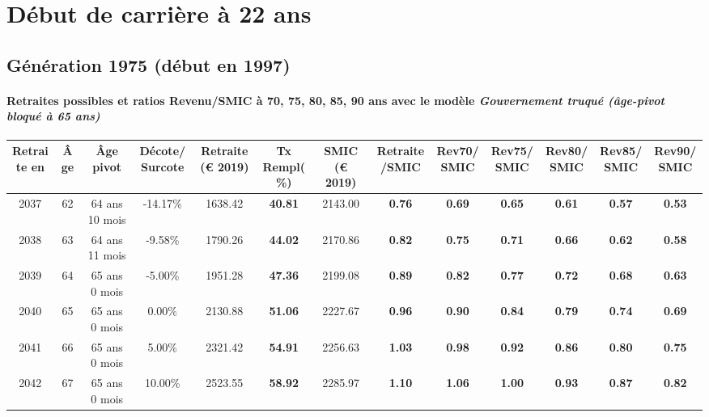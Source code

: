  \addto{\captionsenglish}{ \renewcommand{\mtctitle}{}} \setcounter{minitocdepth}{2} 
 \minitoc \newpage 

\section{Début de carrière à 22 ans} 

\subsection{Génération 1975 (début en 1997)} 

\paragraph{Retraites possibles et ratios Revenu/SMIC à 70, 75, 80, 85, 90 ans avec le modèle \emph{Gouvernement truqué (âge-pivot bloqué à 65 ans)}}  
 
{ \scriptsize \begin{center} 
\begin{tabular}[htb]{|c|c||c|c||c|c||c||c|c|c|c|c|c|} 
\hline 
 Retraite en &  Âge &  Âge pivot &  Décote/Surcote &  Retraite (\euro{} 2019) &  Tx Rempl(\%) &  SMIC (\euro{} 2019) &  Retraite/SMIC &  Rev70/SMIC &  Rev75/SMIC &  Rev80/SMIC &  Rev85/SMIC &  Rev90/SMIC \\ 
\hline \hline 
 2037 &  62 &  64 ans 10 mois &  -14.17\% &  1638.42 &  {\bf 40.81} &  2143.00 &  {\bf {\color{red} 0.76}} &  {\bf {\color{red} 0.69}} &  {\bf {\color{red} 0.65}} &  {\bf {\color{red} 0.61}} &  {\bf {\color{red} 0.57}} &  {\bf {\color{red} 0.53}} \\ 
\hline 
 2038 &  63 &  64 ans 11 mois &  -9.58\% &  1790.26 &  {\bf 44.02} &  2170.86 &  {\bf {\color{red} 0.82}} &  {\bf {\color{red} 0.75}} &  {\bf {\color{red} 0.71}} &  {\bf {\color{red} 0.66}} &  {\bf {\color{red} 0.62}} &  {\bf {\color{red} 0.58}} \\ 
\hline 
 2039 &  64 &  65 ans 0 mois &  -5.00\% &  1951.28 &  {\bf 47.36} &  2199.08 &  {\bf {\color{red} 0.89}} &  {\bf {\color{red} 0.82}} &  {\bf {\color{red} 0.77}} &  {\bf {\color{red} 0.72}} &  {\bf {\color{red} 0.68}} &  {\bf {\color{red} 0.63}} \\ 
\hline 
 2040 &  65 &  65 ans 0 mois &  0.00\% &  2130.88 &  {\bf 51.06} &  2227.67 &  {\bf {\color{red} 0.96}} &  {\bf {\color{red} 0.90}} &  {\bf {\color{red} 0.84}} &  {\bf {\color{red} 0.79}} &  {\bf {\color{red} 0.74}} &  {\bf {\color{red} 0.69}} \\ 
\hline 
 2041 &  66 &  65 ans 0 mois &  5.00\% &  2321.42 &  {\bf 54.91} &  2256.63 &  {\bf 1.03} &  {\bf {\color{red} 0.98}} &  {\bf {\color{red} 0.92}} &  {\bf {\color{red} 0.86}} &  {\bf {\color{red} 0.80}} &  {\bf {\color{red} 0.75}} \\ 
\hline 
 2042 &  67 &  65 ans 0 mois &  10.00\% &  2523.55 &  {\bf 58.92} &  2285.97 &  {\bf 1.10} &  {\bf 1.06} &  {\bf {\color{red} 1.00}} &  {\bf {\color{red} 0.93}} &  {\bf {\color{red} 0.87}} &  {\bf {\color{red} 0.82}} \\ 
\hline 
\hline 
\end{tabular} 
\end{center} } 
